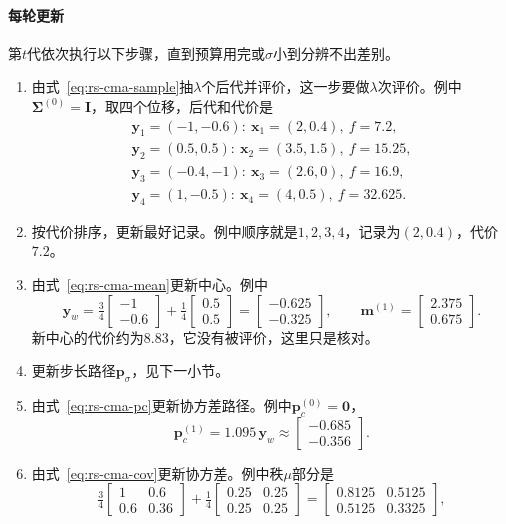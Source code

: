 \paragraph{每轮更新}
第$t$代依次执行以下步骤，直到预算用完或$\sigma$小到分辨不出差别。

\begin{enumerate}
 \item 由式~\eqref{eq:rs-cma-sample}抽$\lambda$个后代并评价，这一步要做$\lambda$次评价。例中$\bm{\Sigma}^{(0)}=\bm{I}$，取四个位移，后代和代价是
 \[
  \begin{gathered}
  \bm{y}_1=(-1,-0.6):\ \bm{x}_1=(2,0.4),\ f=7.2,\\
  \bm{y}_2=(0.5,0.5):\ \bm{x}_2=(3.5,1.5),\ f=15.25,\\
  \bm{y}_3=(-0.4,-1):\ \bm{x}_3=(2.6,0),\ f=16.9,\\
  \bm{y}_4=(1,-0.5):\ \bm{x}_4=(4,0.5),\ f=32.625.
  \end{gathered}
 \]
 \item 按代价排序，更新最好记录。例中顺序就是$1,2,3,4$，记录为$(2,0.4)$，代价$7.2$。
 \item 由式~\eqref{eq:rs-cma-mean}更新中心。例中
 \[
  \bm{y}_w=\tfrac34\begin{bmatrix}-1\\-0.6\end{bmatrix}+\tfrac14\begin{bmatrix}0.5\\0.5\end{bmatrix}=\begin{bmatrix}-0.625\\-0.325\end{bmatrix},\qquad
  \bm{m}^{(1)}=\begin{bmatrix}2.375\\0.675\end{bmatrix}.
 \]
 新中心的代价约为$8.83$，它没有被评价，这里只是核对。
 \item 更新步长路径$\bm{p}_\sigma$，见下一小节。
 \item 由式~\eqref{eq:rs-cma-pc}更新协方差路径。例中$\bm{p}_c^{(0)}=\bm{0}$，
 \[
  \bm{p}_c^{(1)}=1.095\,\bm{y}_w\approx\begin{bmatrix}-0.685\\-0.356\end{bmatrix}.
 \]
 \item 由式~\eqref{eq:rs-cma-cov}更新协方差。例中秩$\mu$部分是
 \[
  \tfrac34\begin{bmatrix}1&0.6\\0.6&0.36\end{bmatrix}+\tfrac14\begin{bmatrix}0.25&0.25\\0.25&0.25\end{bmatrix}=\begin{bmatrix}0.8125&0.5125\\0.5125&0.3325\end{bmatrix},
\]
\end{enumerate}
